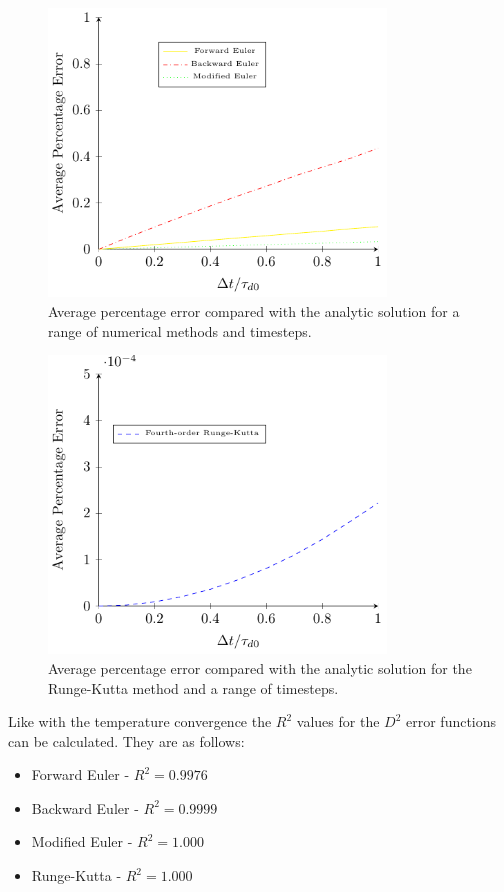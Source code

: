\documentclass[../Interim_Report_Master]{subfiles}
\begin{document}
\begin{figure}[H]
	\centering
	\includegraphics[width=0.8\textwidth]{./Diagrams/Uncoupled_D2_Convergence_2/Uncoupled_D2_Convergence_2.pdf}
	\caption{Average percentage error compared with the analytic solution for a range of numerical methods and timesteps.}
	\label{uc_d2_convergence_2}
\end{figure}

\begin{figure}[H]
	\centering
	\includegraphics[width=0.8\textwidth]{./Diagrams/Uncoupled_D2_Convergence_2/Uncoupled_D2_Convergence_3.pdf}
	\caption{Average percentage error compared with the analytic solution for the Runge-Kutta method and a range of timesteps.}
	\label{uc_d2_convergence_3}
\end{figure}

Like with the temperature convergence the $R^2$ values for the $D^2$ error functions can be calculated. They are as follows:
\begin{itemize}
	\item Forward Euler - $R^2=0.9976$
	\item Backward Euler - $R^2=0.9999$
	\item Modified Euler - $R^2=1.000$
	\item Runge-Kutta - $R^2=1.000$
\end{itemize}
\end{document}
